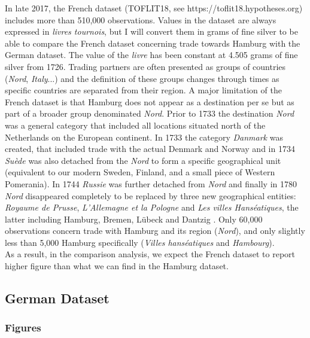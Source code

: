 \documentclass[12pt,a4paper,titlepage,english]{article}
\begin{document}
In late 2017, the French dataset (TOFLIT18, see https://toflit18.hypotheses.org) includes more than 510,000 observations.
Values in the dataset are always expressed in \textit{livres tournois}, but I will convert them in grams of fine silver to be able to compare the French dataset concerning trade towards Hamburg with the German dataset. The value of the \textit{livre} has been constant at 4.505 grams of fine silver from 1726.
Trading partners are often presented as groups of countries (\textit{Nord}, \textit{Italy}...) and the definition of these groups changes through times as specific countries are separated from their region.
A major limitation of the French dataset is that Hamburg does not appear as a destination per se but as part of a broader group denominated \textit{Nord}. Prior to 1733 the destination \textit{Nord} was a general category that included all locations situated north of the Netherlands on the European continent. In 1733 the category \textit{Danmark} was created, that included trade with the actual Denmark and Norway and in 1734 \textit{Suède} was also detached from the \textit{Nord} to form a specific geographical unit (equivalent to our modern Sweden, Finland, and a small piece of Western Pomerania). In 1744 \textit{Russie} was further detached from \textit{Nord} and finally in 1780 \textit{Nord} disappeared completely to be replaced by three new geographical entities: \textit{Royaume de Prusse}, \textit{L’Allemagne et la Pologne} and \textit{Les villes Hanséatiques}, the latter including Hamburg, Bremen, Lübeck and Dantzig \cite{charles_cross-checking_2018}.
Only 60,000 observations concern trade with Hamburg and its region (\textit{Nord}), and only slightly less than 5,000 Hamburg specifically (\textit{Villes hanséatiques} and \textit{Hambourg}).\\
As a result, in the comparison analysis, we expect the French dataset to report higher figure than what we can find in the Hamburg dataset. 

\subsection{German Dataset}
\cite{pfister_great_2017}
\cite{pfister_quantitative_2015}
\cite{schneider_statistik_2001}


\subsubsection{Figures}
\end{document}
